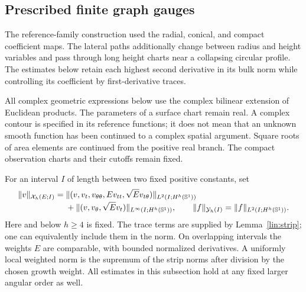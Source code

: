 \subsection{Prescribed finite graph gauges}\label{sec:gauges}

The reference-family construction used the radial, conical, and compact
coefficient maps.  The lateral paths additionally change between radius
and height variables and pass through long height charts near a collapsing
circular profile.  The estimates below retain each highest second
derivative in its bulk norm while controlling its coefficient by
first-derivative traces.

All complex geometric expressions below use the complex bilinear extension of
Euclidean products.  The parameters of a surface chart remain real.  A complex
contour is specified in its reference functions; it does not mean that an
unknown smooth function has been continued to a complex spatial argument.
Square roots of area elements are continued from the positive real branch.
The compact observation charts and their cutoffs remain fixed.

For an interval $I$ of length between two fixed positive constants, set
\begin{align}
 \|v\|_{\mathcal X_h(E;I)}={}&
 \|(v,v_t,v_{\theta\theta},E v_{tt},\sqrt E v_{t\theta})
                         \|_{L^2(I;H^h(\mathbb S^1))}
 \notag\\[-2pt]
 &+\|(v,v_\theta,\sqrt E v_t)\|_{L^\infty(I;H^h(\mathbb S^1))},
 \qquad
 \|f\|_{\mathcal Y_h(I)}=\|f\|_{L^2(I;H^h(\mathbb S^1))}.
 \label{gauge:norm}
\end{align}
Here and below $h\ge4$ is fixed.  The trace terms are supplied by
Lemma~\ref{lin:strip}; one can equivalently include them in the norm.
On overlapping intervals the weights $E$ are comparable, with bounded
normalized derivatives.  A uniformly local weighted norm is the supremum
of the strip norms after division by the chosen growth weight.  All estimates
in this subsection hold at any fixed larger angular order as well.

